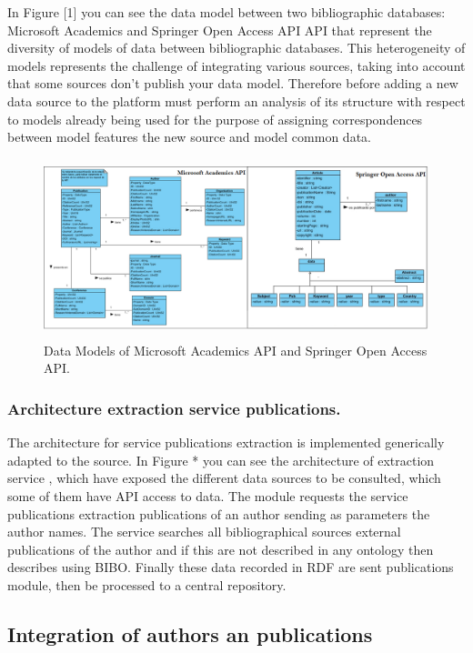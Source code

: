 \documentclass[11pt]{article}
\begin{document}
In Figure [1] you can see the data model between two bibliographic databases: Microsoft Academics and Springer Open Access API API that represent the diversity of models of data between bibliographic databases. This heterogeneity of models represents the challenge of integrating various sources, taking into account that some sources don't publish your data model. Therefore before adding a new data source to the platform must perform an analysis of its structure with respect to models already being used for the purpose of assigning correspondences between model features the new source and model common data.
 \begin{figure}[ht!]
	\centering
		\includegraphics[height=5.2cm]{modelosMA_Springer.png}
	\caption{Data Models of Microsoft Academics API and Springer Open Access API.}
	\label{fig:Escudo2}
\end{figure}

\subsubsection{Architecture extraction service publications.}

The architecture for service publications extraction is implemented generically adapted to the source. In Figure * you can see the architecture of extraction service , which have exposed the different data sources to be consulted, which some of them have API access to data. The module requests the service publications extraction publications of an author sending as parameters the author names. The service searches all bibliographical sources external publications of the author and if this are not described in any ontology then describes using BIBO. Finally these data recorded in RDF are sent publications module, then be processed to a central repository.

\subsection{Integration of authors an publications}
\end{document}
